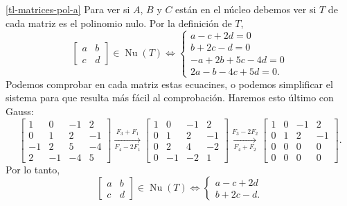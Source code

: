 \begin{enumerate}[topsep=6pt, itemsep=.4cm]
    \ref{tl-matrices-pol-a}  Para ver si $A$, $B$ y $C$ están en el núcleo debemos ver si $T$ de cada matriz es el polinomio nulo. Por la definición de $T$,
    $$
    \begin{bmatrix}  a&b\\c&d \end{bmatrix} \in \operatorname{Nu}(T) \Leftrightarrow \begin{cases}
        a-c+2d=0\\
        b+2c-d=0\\
        -a+2b+5c-4d=0\\
        2a-b-4c+5d=0.
    \end{cases}
    $$
    Podemos comprobar en cada matriz estas ecuacines, o podemos simplificar el sistema para que resulta más fácil al comprobación. Haremos esto último con Gauss:
    \begin{equation*}
        \begin{bmatrix}
            1 & 0 & -1 & 2 \\
            0 & 1 & 2 & -1 \\
            -1 & 2 & 5 & -4 \\
            2 & -1 & -4 & 5
        \end{bmatrix}
        \underset{F_4-2F_1}{\stackrel{F_3+F_1}{\longrightarrow}}
        \begin{bmatrix}
            1 & 0 & -1 & 2 \\
            0 & 1 & 2 & -1 \\
            0 & 2 & 4 & -2 \\
            0 & -1 & -2 & 1
        \end{bmatrix}
        \underset{F_4+F_2}{\stackrel{F_3-2F_2}{\longrightarrow}}
        \begin{bmatrix}
            1 & 0 & -1 & 2 \\
            0 & 1 & 2 & -1 \\
            0 & 0 & 0 & 0 \\
            0 & 0 & 0 & 0
        \end{bmatrix}.
    \end{equation*}
    Por lo tanto, 
    $$
    \begin{bmatrix}  a&b\\c&d \end{bmatrix} \in \operatorname{Nu}(T) \Leftrightarrow \begin{cases}
        a-c+2d\\
        b+2c-d.
    \end{cases}
$$
\end{enumerate}
